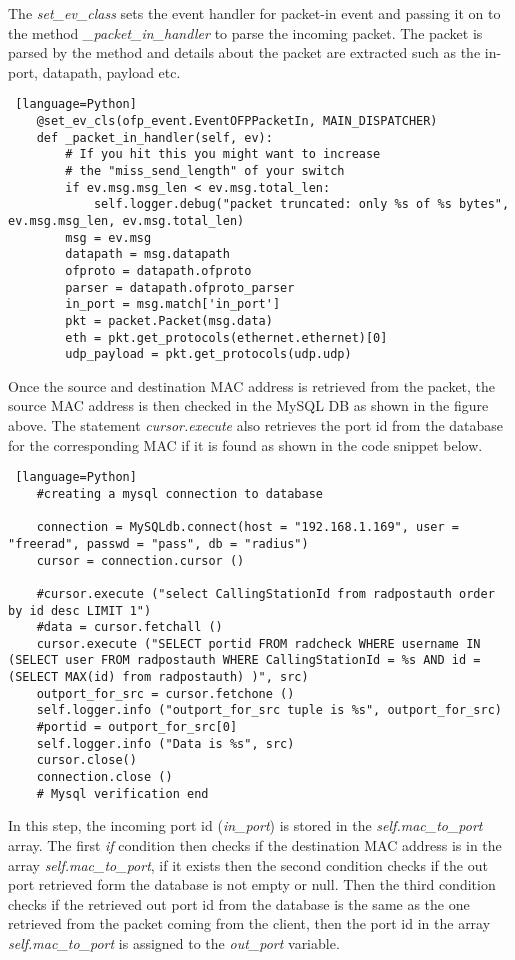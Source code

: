 The \textit{set\_ev\_class} sets the event handler for packet-in event and passing it on to the method \textit{ \_packet\_in\_handler} to parse the incoming packet. The packet is parsed by the method and details about the packet are extracted such as the in-port, datapath, payload etc.

\begin{lstlisting} [language=Python]
	@set_ev_cls(ofp_event.EventOFPPacketIn, MAIN_DISPATCHER)
	def _packet_in_handler(self, ev):
		# If you hit this you might want to increase
		# the "miss_send_length" of your switch
		if ev.msg.msg_len < ev.msg.total_len:
			self.logger.debug("packet truncated: only %s of %s bytes", ev.msg.msg_len, ev.msg.total_len)
		msg = ev.msg
		datapath = msg.datapath
		ofproto = datapath.ofproto
		parser = datapath.ofproto_parser
		in_port = msg.match['in_port']
		pkt = packet.Packet(msg.data)
		eth = pkt.get_protocols(ethernet.ethernet)[0]
		udp_payload = pkt.get_protocols(udp.udp)
\end{lstlisting}

Once the source and destination MAC address is retrieved from the packet, the source MAC address is then checked in the MySQL DB as shown in the figure above. The statement \textit{cursor.execute} also retrieves the port id from the database for the corresponding MAC if it is found as shown in the code snippet below.

\begin{lstlisting} [language=Python]
	#creating a mysql connection to database
		
	connection = MySQLdb.connect(host = "192.168.1.169", user = "freerad", passwd = "pass", db = "radius")
	cursor = connection.cursor ()
	
	#cursor.execute ("select CallingStationId from radpostauth order by id desc LIMIT 1")
	#data = cursor.fetchall ()
	cursor.execute ("SELECT portid FROM radcheck WHERE username IN (SELECT user FROM radpostauth WHERE CallingStationId = %s AND id = (SELECT MAX(id) from radpostauth) )", src)
	outport_for_src = cursor.fetchone ()
	self.logger.info ("outport_for_src tuple is %s", outport_for_src)
	#portid = outport_for_src[0]
	self.logger.info ("Data is %s", src)	
	cursor.close()
	connection.close ()
	# Mysql verification end
\end{lstlisting}

In this step, the incoming port id (\textit{in\_port}) is stored in the \textit{self.mac\_to\_port} array. The first \textit{if} condition then checks if the destination MAC address is in the array \textit{self.mac\_to\_port}, if it exists then the second condition checks if the out port retrieved form the database is not empty or null. Then the third condition checks if the retrieved out port id from the database is the same as the one retrieved from the packet coming from the client, then the port id in the array \textit{self.mac\_to\_port} is assigned to the \textit{out\_port} variable.


